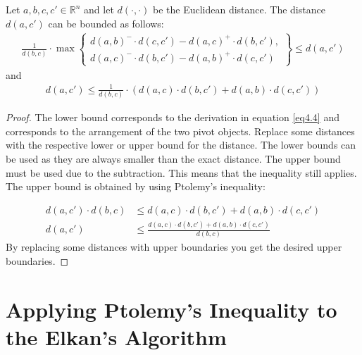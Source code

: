 \begin{theorem}
	\label{thm4.2}
	Let \(a, b, c, c' \in \mathbb{R}^n\) and let \(d(\cdot, \cdot)\) be the Euclidean distance. The distance \(d(a, c')\) can be bounded as follows:
	\begin{gather}
		\frac{1}{d(b, c)} \cdot \max \left\{
		\begin{array}{l}
			d(a, b)^- \cdot d(c, c') - d(a, c)^+ \cdot d(b, c'), \\
			d(a, c)^- \cdot d(b, c') - d(a, b)^+ \cdot d(c, c')
		\end{array}
		\right\} \leq d(a, c')
	\end{gather}
	and
	\begin{gather}
		d(a, c') \leq \frac{1}{d(b, c)} \cdot \left( d(a, c) \cdot d(b, c') + d(a, b) \cdot d(c, c') \right)
	\end{gather}
\end{theorem}
\begin{proof}
	The lower bound corresponds to the derivation in equation \ref{eq4.4} and corresponds to the arrangement of the two pivot objects. Replace some distances with the respective lower or upper bound for the distance. The lower bounds can be used as they are always smaller than the exact distance. The upper bound must be used due to the subtraction. This means that the inequality still applies. The upper bound is obtained by using Ptolemy's inequality:

	\begin{equation*}
		\begin{aligned}
			\label{eq4.7}
			d(a,c') \cdot d(b,c) & \leq d(a, c) \cdot d(b, c') + d(a, b) \cdot d(c, c')                \\
			d(a,c')              & \leq \frac{d(a, c) \cdot d(b, c') + d(a, b) \cdot d(c, c')}{d(b,c)}
		\end{aligned}
	\end{equation*}
	By replacing some distances with upper boundaries you get the desired upper boundaries.
\end{proof}




\section{Applying Ptolemy's Inequality to the Elkan's Algorithm}




